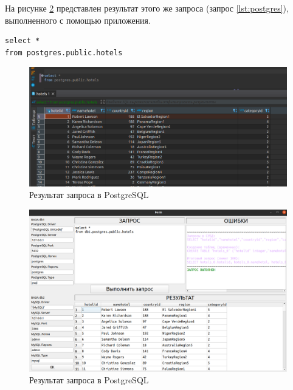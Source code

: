 На рисунке \ref{img:work2_1} представлен результат этого же запроса (запрос \ref{lst:postgres}), выполненного с помощью приложения.

\begin{lstlisting}[label=lst:postgres,caption=Запрос в PostgreSQL]
select *
from postgres.public.hotels 
\end{lstlisting}

\begin{figure}[h!]
	\begin{center}
		\includegraphics[scale=0.6]{./inc/img/postgres1}
		\caption{Результат запроса в PostgreSQL}
		\label{img:work2}
	\end{center}
\end{figure}

\begin{figure}[h!]
	\begin{center}
		\includegraphics[scale=0.4]{./inc/img/postgres1_1}
		\caption{Результат запроса в PostgreSQL}
		\label{img:work2_1}
	\end{center}
\end{figure}

\newpage

